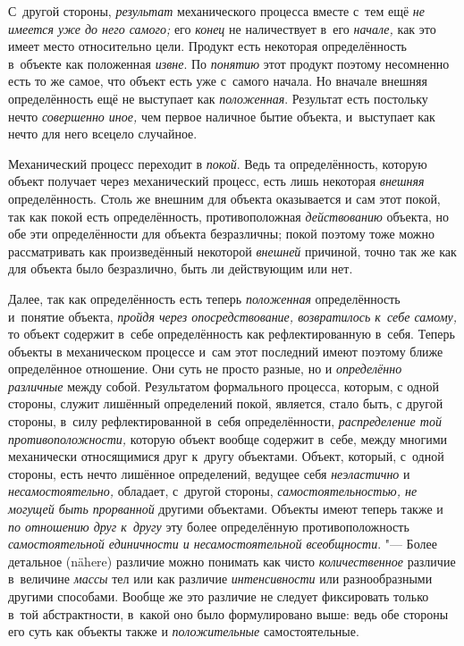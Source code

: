 С~другой стороны, {\em результат} механического процесса вместе с~тем ещё
{\em не имеется уже до него самого;} его {\em конец} не наличествует в~его
{\em начале,} как это имеет место относительно цели. Продукт есть некоторая
определённость в~объекте как положенная {\em извне}. По {\em понятию}
этот продукт поэтому несомненно есть то же самое, что объект
есть уже с~самого начала. Но вначале внешняя определённость ещё не
выступает как {\em положенная}. Результат есть постольку нечто
{\em совершенно иное,} чем первое наличное бытие объекта, и~выступает
как нечто для него всецело случайное.


Механический процесс переходит в {\em покой}. Ведь та
определённость, которую объект получает через механический процесс, есть
лишь некоторая {\em внешняя}
определённость. Столь же внешним для объекта оказывается и
сам этот покой, так как покой есть определённость, противоположная
{\em действованию}
объекта, но обе эти определённости для объекта безразличны;
покой поэтому тоже можно рассматривать как произведённый некоторой
{\em внешней} причиной,
точно так же как для объекта было безразлично, быть ли действующим или нет.

Далее, так как определённость есть теперь
{\em положенная}
определённость и~понятие объекта,
{\em пройдя через опосредствование,
возвратилось к~себе самому,} то объект содержит в~себе
определённость как рефлектированную в~себя. Теперь объекты в
механическом процессе и~сам этот последний имеют поэтому ближе определённое
отношение. Они суть не просто разные, но и
{\em определённо различные}
между собой. Результатом формального процесса, которым, с
одной стороны, служит лишённый определений покой, является, стало быть, с
другой стороны, в~силу рефлектированной в~себя определённости,
{\em распределение той
противоположности,} которую объект вообще содержит в~себе,
между многими механически относящимися друг к~другу объектами. Объект,
который, с~одной стороны, есть нечто лишённое определений, ведущее себя
{\em неэластично} и
{\em несамостоятельно,}
обладает, с~другой стороны,
{\em самостоятельностью, не могущей быть
прорванной} другими объектами. Объекты имеют теперь также и
{\em по отношению друг к~другу}
эту более определённую противоположность
{\em самостоятельной единичности и
несамостоятельной всеобщности}. "--- Более детальное (nähere)
различие можно понимать как чисто
{\em количественное}
различие в~величине
{\em массы} тел или как
различие {\em интенсивности}
или разнообразными другими способами. Вообще же это различие
не следует фиксировать только в~той абстрактности, в~какой оно было
формулировано выше: ведь обе стороны его суть как объекты также и
{\em положительные}
самостоятельные.

